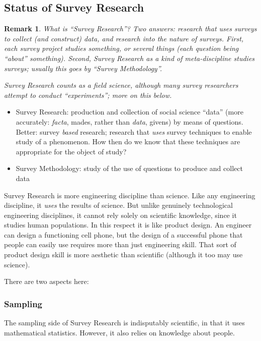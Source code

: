 \documentclass[11pt,twoside]{article}
\newtheorem{remark}{Remark}
\newcommand{\SMeth}{Survey Methodology}
\newcommand{\SR}{Survey Research}
\begin{document}
\subsection{Status of \SR{}}

\begin{remark}
What is ``\SR{}''?  Two answers: research that \textit{uses} surveys
to collect (and construct) data, and research into the nature of
surveys.  First, each survey project studies something, or several
things (each question being ``about'' something).  Second, \SR{} as a
kind of meta-discipline studies surveys; usually this goes by
``\SMeth{}''.

\SR{} counts as a field science, although many survey researchers attempt to conduct ``experiments''; more on this below.
\end{remark}

\begin{itemize}
\item \SR{}: production and collection of social science ``data''
  (more accurately: \textit{facta}, mades, rather than \textit{data},
  givens) by means of questions.  Better: survey \textit{based}
  research; research that \textit{uses} survey techniques to enable
  study of a phenomenon.  How then do we know that these techniques
  are appropriate for the object of study?
\item \SMeth: study of the use of questions to produce and collect data
\end{itemize}

\SR{} is more engineering discipline than science.  Like any
engineering discipline, it \textit{uses} the results of science.  But
unlike genuinely technological engineering disciplines, it cannot rely
solely on scientific knowledge, since it studies human populations.
In this respect it is like product design.  An engineer can design a
functioning cell phone, but the design of a successful phone that
people can easily use requires more than just engineering skill.  That
sort of product design skill is more aesthetic than scientific
(although it too may use science).

There are two aspects here:

\subsubsection{Sampling}

The sampling side of \SR{} is indisputably scientific, in that it uses
mathematical statistics.  However, it also relies on knowledge about
people.
\end{document}
